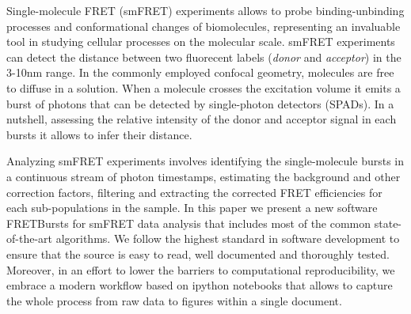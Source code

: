 Single-molecule FRET (smFRET) experiments allows to probe binding-unbinding processes and conformational changes of biomolecules, representing an invaluable tool in studying cellular processes on the molecular scale\cite{Kapanidis_2006}. smFRET experiments can detect the distance between two fluorecent labels (\textit{donor} and \textit{acceptor}) in the 3-10nm range. In the commonly employed confocal geometry, molecules are free to diffuse in a solution. When a molecule crosses the excitation volume it emits a burst of photons that can be detected by single-photon detectors (SPADs). In a nutshell, assessing the relative intensity of the donor and acceptor signal in each bursts it allows to infer their distance. 

Analyzing smFRET experiments involves identifying the single-molecule bursts in a continuous stream of photon timestamps, estimating the background and other correction factors, filtering and extracting the corrected FRET efficiencies for each sub-populations in the sample. In this paper we present a new software FRETBursts for smFRET data analysis that includes most of the common state-of-the-art algorithms. We follow the highest standard in software development to ensure that the source is easy to read, well documented and thoroughly tested. Moreover, in an effort to lower the barriers to computational reproducibility, we embrace a modern workflow based on ipython notebooks that allows to capture the whole process from raw data to figures within a single document.
